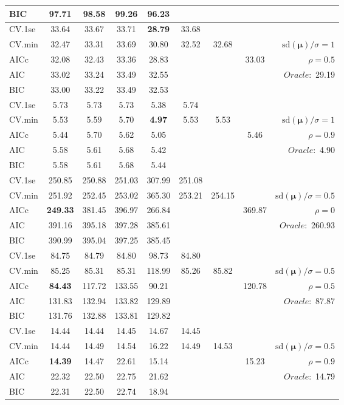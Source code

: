 \begin{table}
\begin{center}
\begin{tabular}{l*{7}{c}|r}
BIC & 97.71 & 98.58 & 99.26 & 96.23 & & & &  \\
 \hline 
CV.1se & 33.64 & 33.67 & 33.71 & {\bf 28.79} & 33.68 & & & \\
CV.min & 32.47 & 33.31 & 33.69 & 30.80 & 32.52 & 32.68 & & $\mathrm{sd}(\mathbf{\mu})/\sigma=1$ \\
AICc & 32.08 & 32.43 & 33.36 & 28.83 & & & 33.03 &  $\rho=0.5$ \\
AIC & 33.02 & 33.24 & 33.49 & 32.55 & & & &  \multirow{2}{*}{$Oracle: $ 29.19} \\
BIC & 33.00 & 33.22 & 33.49 & 32.53 & & & &  \\
 \hline 
CV.1se & 5.73 & 5.73 & 5.73 & 5.38 & 5.74 & & & \\
CV.min & 5.53 & 5.59 & 5.70 & {\bf 4.97} & 5.53 & 5.53 & & $\mathrm{sd}(\mathbf{\mu})/\sigma=1$ \\
AICc & 5.44 & 5.70 & 5.62 & 5.05 & & & 5.46 &  $\rho=0.9$ \\
AIC & 5.58 & 5.61 & 5.68 & 5.42 & & & &  \multirow{2}{*}{$Oracle: $ 4.90} \\
BIC & 5.58 & 5.61 & 5.68 & 5.44 & & & &  \\
 \hline 
CV.1se & 250.85 & 250.88 & 251.03 & 307.99 & 251.08 & & & \\
CV.min & 251.92 & 252.45 & 253.02 & 365.30 & 253.21 & 254.15 & & $\mathrm{sd}(\mathbf{\mu})/\sigma=0.5$ \\
AICc & {\bf 249.33} & 381.45 & 396.97 & 266.84 & & & 369.87 &  $\rho=0$ \\
AIC & 391.16 & 395.18 & 397.28 & 385.61 & & & &  \multirow{2}{*}{$Oracle: $ 260.93} \\
BIC & 390.99 & 395.04 & 397.25 & 385.45 & & & &  \\
 \hline 
CV.1se & 84.75 & 84.79 & 84.80 & 98.73 & 84.80 & & & \\
CV.min & 85.25 & 85.31 & 85.31 & 118.99 & 85.26 & 85.82 & & $\mathrm{sd}(\mathbf{\mu})/\sigma=0.5$ \\
AICc & {\bf 84.43} & 117.72 & 133.55 & 90.21 & & & 120.78 &  $\rho=0.5$ \\
AIC & 131.83 & 132.94 & 133.82 & 129.89 & & & &  \multirow{2}{*}{$Oracle: $ 87.87} \\
BIC & 131.76 & 132.88 & 133.81 & 129.82 & & & &  \\
 \hline 
CV.1se & 14.44 & 14.44 & 14.45 & 14.67 & 14.45 & & & \\
CV.min & 14.44 & 14.49 & 14.54 & 16.22 & 14.49 & 14.53 & & $\mathrm{sd}(\mathbf{\mu})/\sigma=0.5$ \\
AICc & {\bf 14.39} & 14.47 & 22.61 & 15.14 & & & 15.23 &  $\rho=0.9$ \\
AIC & 22.32 & 22.50 & 22.75 & 21.62 & & & &  \multirow{2}{*}{$Oracle: $ 14.79} \\
BIC & 22.31 & 22.50 & 22.74 & 18.94 & & & &  \\
 \hline 
\end{tabular}
\end{center}
\vspace{-1cm}
\end{table}





